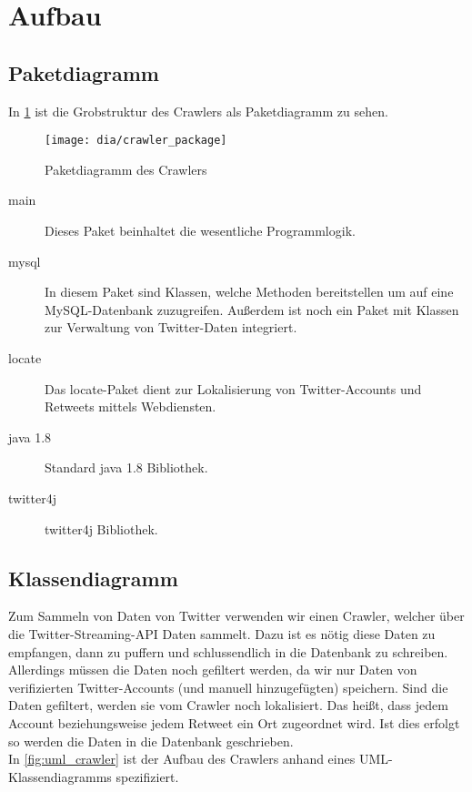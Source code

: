 \section{Aufbau}

\subsection{Paketdiagramm}
In \cref{fig:crawler_package} ist die Grobstruktur des Crawlers als Paketdiagramm zu sehen.
\begin{figure}[h!]
	\centering
	\texttt{[image: dia/crawler\_package]}
	\caption{Paketdiagramm des Crawlers}
	\label{fig:crawler_package}
\end{figure}

\begin{description}
\item[main] Dieses Paket beinhaltet die wesentliche Programmlogik.
\item[mysql] In diesem Paket sind Klassen, welche Methoden bereitstellen um auf eine MySQL-Datenbank zuzugreifen. Außerdem ist noch ein Paket mit Klassen zur Verwaltung von Twitter-Daten integriert.
\item[locate] Das locate-Paket dient zur Lokalisierung von Twitter-Accounts und Retweets mittels Webdiensten.
\item[java 1.8] Standard java 1.8 Bibliothek.
\item[twitter4j] twitter4j Bibliothek.
\end{description}

\subsection{Klassendiagramm}
Zum Sammeln von Daten von Twitter verwenden wir einen Crawler, welcher über die Twitter-Streaming-API Daten sammelt. Dazu ist es nötig diese Daten zu empfangen, dann zu puffern und schlussendlich in die Datenbank zu schreiben. Allerdings müssen die Daten noch gefiltert werden, da wir nur Daten von verifizierten Twitter-Accounts (und manuell hinzugefügten) speichern. Sind die Daten gefiltert, werden sie vom Crawler noch lokalisiert. Das heißt, dass jedem Account beziehungsweise jedem Retweet ein Ort zugeordnet wird. Ist dies erfolgt so werden die Daten in die Datenbank geschrieben.
\\ In \cref{fig:uml_crawler} ist der Aufbau des Crawlers anhand eines UML-Klassendiagramms spezifiziert.

